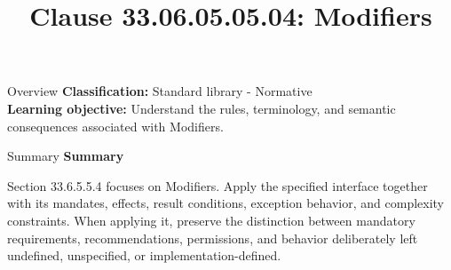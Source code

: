 \documentclass[10pt,letterpaper]{article}
\title{Clause 33.06.05.05.04: Modifiers}
\author{}
\date{}
\begin{document}
\maketitle
\begin{CornellOverviewBox}{Overview}
\textbf{Classification:} Standard library - Normative\\[2pt]
\textbf{Learning objective:} Understand the rules, terminology, and semantic consequences associated with Modifiers.
\end{CornellOverviewBox}\begin{CornellSummaryBox}{Summary}
{\sffamily\bfseries\color{Accent} Summary}\par\vspace{3pt}Section 33.6.5.5.4 focuses on Modifiers. Apply the specified interface together with its mandates, effects, result conditions, exception behavior, and complexity constraints. When applying it, preserve the distinction between mandatory requirements, recommendations, permissions, and behavior deliberately left undefined, unspecified, or implementation-defined.
\end{CornellSummaryBox}
\end{document}
